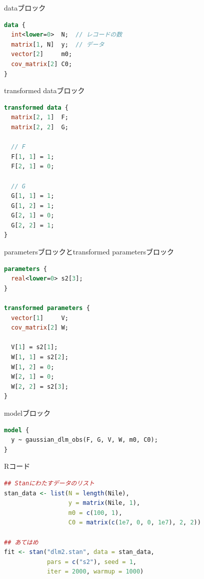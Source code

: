 \documentclass[dvipdfmx,12pt]{beamer}
\begin{document}
\begin{frame}[fragile]{dataブロック}
  \begin{lstlisting}[language=Stan]
data {
  int<lower=0>  N;  // レコードの数
  matrix[1, N]  y;  // データ
  vector[2]     m0;
  cov_matrix[2] C0;
}
  \end{lstlisting}
\end{frame}

\begin{frame}[fragile]{transformed dataブロック}
  \begin{lstlisting}[language=Stan]
transformed data {
  matrix[2, 1]  F;
  matrix[2, 2]  G;

  // F
  F[1, 1] = 1;
  F[2, 1] = 0;

  // G
  G[1, 1] = 1;
  G[1, 2] = 1;
  G[2, 1] = 0;
  G[2, 2] = 1;
}
  \end{lstlisting}
\end{frame}

\begin{frame}[fragile]{parametersブロックとtransformed parametersブロック}
  \begin{lstlisting}[language=Stan]
parameters {
  real<lower=0> s2[3];
}

transformed parameters {
  vector[1]     V;
  cov_matrix[2] W;

  V[1] = s2[1];
  W[1, 1] = s2[2];
  W[1, 2] = 0;
  W[2, 1] = 0;
  W[2, 2] = s2[3];
}
  \end{lstlisting}
\end{frame}

\begin{frame}[fragile]{modelブロック}
  \begin{lstlisting}[language=Stan]
model {
  y ~ gaussian_dlm_obs(F, G, V, W, m0, C0);
}
  \end{lstlisting}
\end{frame}

\begin{frame}[fragile]{Rコード}
  \begin{lstlisting}[language=R]
## Stanにわたすデータのリスト
stan_data <- list(N = length(Nile),
                  y = matrix(Nile, 1),
                  m0 = c(100, 1),
                  C0 = matrix(c(1e7, 0, 0, 1e7), 2, 2))

## あてはめ
fit <- stan("dlm2.stan", data = stan_data,
            pars = c("s2"), seed = 1,
            iter = 2000, warmup = 1000)
  \end{lstlisting}
\end{frame}
\end{document}
